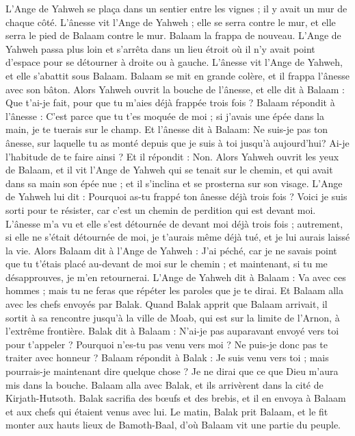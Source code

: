 \begin{multicols}{2}
L’Ange de Yahweh se plaça dans un sentier entre les vignes ; il y avait un mur de chaque côté.
L'ânesse vit l'Ange de Yahweh ; elle se serra contre le mur, et elle serra le pied de Balaam contre le mur. Balaam la frappa de nouveau.
L'Ange de Yahweh passa plus loin et s'arrêta dans un lieu étroit où il n'y avait point d’espace pour se détourner à droite ou à gauche.
L'ânesse vit l'Ange de Yahweh, et elle s’abattit sous Balaam. Balaam se mit en grande colère, et il frappa l'ânesse avec son bâton.
Alors Yahweh ouvrit la bouche de l'ânesse, et elle dit à Balaam : Que t'ai-je fait, pour que tu m'aies déjà frappée trois fois ?
Balaam répondit à l'ânesse : C’est parce que tu t'es moquée de moi ; si j’avais une épée dans la main, je te tuerais sur le champ.
Et l'ânesse dit à Balaam: Ne suis-je pas ton ânesse, sur laquelle tu as monté depuis que je suis à toi jusqu'à aujourd'hui? Ai-je l’habitude de te faire ainsi ? Et il répondit : Non.
Alors Yahweh ouvrit les yeux de Balaam, et il vit l'Ange de Yahweh qui se tenait sur le chemin, et qui avait dans sa main son épée nue ; et il s'inclina et se prosterna sur son visage.
L'Ange de Yahweh lui dit : Pourquoi as-tu frappé ton ânesse déjà trois fois ? Voici je suis sorti pour te résister, car c’est un chemin de perdition qui est devant moi.
L'ânesse m'a vu et elle s'est détournée de devant moi déjà trois fois ; autrement, si elle ne s'était détournée de moi, je t'aurais même déjà tué, et je lui aurais laissé la vie.
Alors Balaam dit à l'Ange de Yahweh : J'ai péché, car je ne savais point que tu t’étais placé au-devant de moi sur le chemin ; et maintenant, si tu me désapprouves, je m'en retournerai.
L'Ange de Yahweh dit à Balaam : Va avec ces hommes ; mais tu ne feras que répéter les paroles que je te dirai. Et Balaam alla avec les chefs envoyés par Balak.
Quand Balak apprit que Balaam arrivait, il sortit à sa rencontre jusqu’à la ville de Moab, qui est sur la limite de l'Arnon, à l’extrême frontière.
Balak dit à Balaam : N'ai-je pas auparavant envoyé vers toi pour t'appeler ? Pourquoi n'es-tu pas venu vers moi ? Ne puis-je donc pas te traiter avec honneur ?
Balaam répondit à Balak : Je suis venu vers toi ; mais pourrais-je maintenant dire quelque chose ? Je ne dirai que ce que Dieu m'aura mis dans la bouche.
Balaam alla avec Balak, et ils arrivèrent dans la cité de Kirjath-Hutsoth.
Balak sacrifia des bœufs et des brebis, et il en envoya à Balaam et aux chefs qui étaient venus avec lui.
Le matin, Balak prit Balaam, et le fit monter aux hauts lieux de Bamoth-Baal, d’où Balaam vit une partie du peuple.

\end{multicols}
